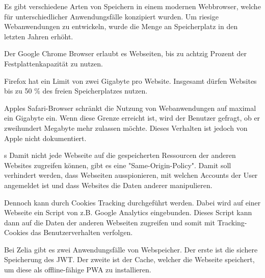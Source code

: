

Es gibt verschiedene Arten von Speichern in einem modernen Webbrowser, welche für unterschiedlicher Anwendungsfälle konzipiert wurden. Um riesige Webanwendungen zu entwickeln, wurde die Menge an Speicherplatz in den letzten Jahren erhöht. 


Der Google Chrome Browser erlaubt es Webseiten, bis zu achtzig Prozent der Festplattenkapazität zu nutzen.

Firefox hat ein Limit von zwei Gigabyte pro Website. Insgesamt dürfen Websites bis zu 50 \% des freien Speicherplatzes nutzen.

Apples Safari-Browser schränkt die Nutzung von Webanwendungen auf maximal ein Gigabyte ein. Wenn diese Grenze erreicht ist, wird der Benutzer gefragt, ob er zweihundert Megabyte mehr zulassen möchte. Dieses Verhalten ist jedoch von Apple nicht dokumentiert.

s
Damit nicht jede Webseite auf die gespeicherten Ressourcen der anderen Websites zugreifen können, gibt es eine "Same-Origin-Policy". Damit soll verhindert werden, dass Webseiten ausspionieren, mit welchen Accounts der User angemeldet ist und dass Websites die Daten anderer manipulieren.

Dennoch kann durch Cookies Tracking durchgeführt werden. Dabei wird auf einer Webseite ein Script von z.B. Google Analytics eingebunden. Dieses Script kann dann auf die Daten der anderen Webseiten zugreifen und somit mit Tracking-Cookies das Benutzerverhalten verfolgen.











Bei Zelia gibt es zwei Anwendungsfälle von Webspeicher. Der erste ist die sichere Speicherung des JWT. Der zweite ist der Cache, welcher die Webseite speichert, um diese als offline-fähige PWA zu installieren.

